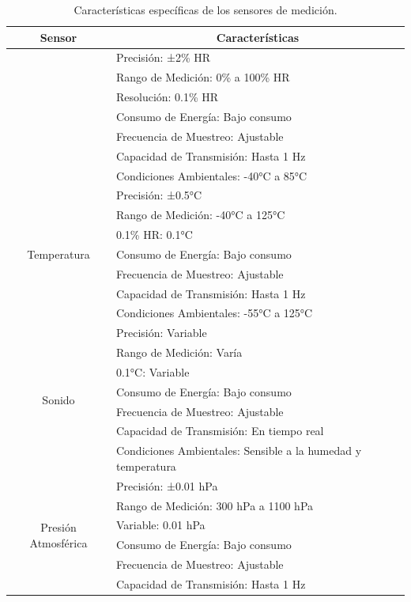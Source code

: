 \begin{longtable}[c]{|c|l|}
\caption{Características específicas de los sensores de medición.}
\label{tab:my-table}\\
\hline
Sensor & \multicolumn{1}{c|}{Características} \\ \hline
\endfirsthead
%
\endhead
%
\hline
\endfoot
%
\endlastfoot
%
\multirow{7}{*}{Humedad} & Precisión:   ±2\% HR \\
 & Rango de Medición: 0\% a 100\%   HR \\
 & Resolución: 0.1\% HR \\
 & Consumo de Energía: Bajo   consumo \\
 & Frecuencia de Muestreo:   Ajustable \\
 & Capacidad de Transmisión:   Hasta 1 Hz \\
 & Condiciones Ambientales: -40°C   a 85°C \\ \hline
\multirow{7}{*}{Temperatura} & Precisión: ±0.5°C \\
 & Rango de Medición: -40°C a   125°C \\
 & 0.1\% HR: 0.1°C \\
 & Consumo de Energía: Bajo   consumo \\
 & Frecuencia de Muestreo:   Ajustable \\
 & Capacidad de Transmisión:   Hasta 1 Hz \\
 & Condiciones Ambientales: -55°C   a 125°C \\ \hline
\multirow{7}{*}{Sonido} & Precisión: Variable \\
 & Rango de Medición: Varía \\
 & 0.1°C: Variable \\
 & Consumo de Energía: Bajo   consumo \\
 & Frecuencia de Muestreo:   Ajustable \\
 & Capacidad de Transmisión: En   tiempo real \\
 & Condiciones Ambientales:   Sensible a la humedad y temperatura \\ \hline
\multirow{7}{*}{Presión Atmosférica} & Precisión: ±0.01 hPa \\
 & Rango de Medición: 300 hPa a   1100 hPa \\
 & Variable: 0.01 hPa \\
 & Consumo de Energía: Bajo   consumo \\
 & Frecuencia de Muestreo:   Ajustable \\
 & Capacidad de Transmisión:   Hasta 1 Hz \\

\end{longtable}
